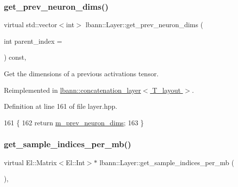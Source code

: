 \subsubsection{\texorpdfstring{get\+\_\+prev\+\_\+neuron\+\_\+dims()}{get\_prev\_neuron\_dims()}}
{\footnotesize\ttfamily virtual std\+::vector$<$int$>$ lbann\+::\+Layer\+::get\+\_\+prev\+\_\+neuron\+\_\+dims (\begin{DoxyParamCaption}\item[{int}]{parent\+\_\+index = {} }\end{DoxyParamCaption}) const\hspace{0.3cm}{\ttfamily [inline]}, {\ttfamily [virtual]}}

Get the dimensions of a previous activations tensor. 

Reimplemented in \hyperlink{classlbann_1_1concatenation__layer_af0e60f4a7e00657ceb429aaa8d7f5040}{lbann\+::concatenation\+\_\+layer$<$ T\+\_\+layout $>$}.



Definition at line 161 of file layer.\+hpp.


\begin{DoxyCode}
161                                                                           \{
162     \textcolor{keywordflow}{return} \hyperlink{classlbann_1_1Layer_ae204d1a2a79606eaa117273857ff62a3}{m\_prev\_neuron\_dims};
163   \}
\end{DoxyCode}
\mbox{\label{classlbann_1_1Layer_a0ac13af6f5ee8316d64c550bef919ee0}} 
\subsubsection{\texorpdfstring{get\+\_\+sample\+\_\+indices\+\_\+per\+\_\+mb()}{get\_sample\_indices\_per\_mb()}}
{\footnotesize\ttfamily virtual El\+::\+Matrix$<$El\+::\+Int$>$$\ast$ lbann\+::\+Layer\+::get\+\_\+sample\+\_\+indices\+\_\+per\+\_\+mb (\begin{DoxyParamCaption}{ }\end{DoxyParamCaption})\hspace{0.3cm}{\ttfamily [inline]}, {\ttfamily [virtual]}}



